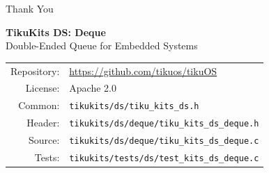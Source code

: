 \documentclass[aspectratio=169, 10pt]{beamer}
\begin{document}
\begin{frame}{Thank You}
\begin{center}
\Large\textbf{TikuKits DS: Deque}\\[0.5em]
\normalsize Double-Ended Queue for Embedded Systems\\[1.5em]

\begin{tabular}{rl}
  Repository: & \url{https://github.com/tikuos/tikuOS} \\
  License:    & Apache 2.0 \\
  Common:     & \texttt{tikukits/ds/tiku\_kits\_ds.h} \\
  Header:     & \texttt{tikukits/ds/deque/tiku\_kits\_ds\_deque.h} \\
  Source:     & \texttt{tikukits/ds/deque/tiku\_kits\_ds\_deque.c} \\
  Tests:      & \texttt{tikukits/tests/ds/test\_kits\_ds\_deque.c} \\
\end{tabular}
\end{center}
\end{frame}
\end{document}
